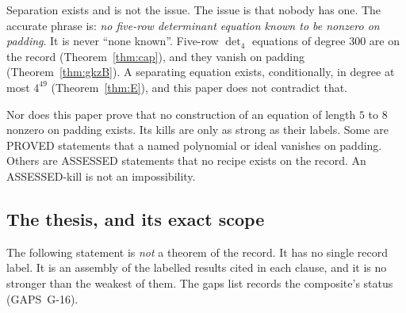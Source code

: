 \documentclass[11pt]{amsart}
\theoremstyle{plain}
\theoremstyle{definition}
\theoremstyle{remark}
\begin{document}
Separation exists and is not the issue. The issue is that nobody has one. The accurate
phrase is: \emph{no five-row determinant equation known to be nonzero on padding}. It is
never ``none known''. Five-row $\det_4$ equations of degree $300$ are on the record
(Theorem~\ref{thm:cap}), and they vanish on padding (Theorem~\ref{thm:gkzB}). A separating
equation exists, conditionally, in degree at most $4^{49}$ (Theorem~\ref{thm:E}), and this paper
does not contradict that.

Nor does this paper prove that no construction of an equation of length $5$ to $8$ nonzero on
padding exists. Its kills are only as strong as their labels. Some are PROVED statements that a
named polynomial or ideal vanishes on padding. Others are ASSESSED statements that no recipe
exists on the record. An ASSESSED-kill is not an impossibility.

\subsection{The thesis, and its exact scope}
The following statement is \emph{not} a theorem of the record. It has no single record label.
It is an assembly of the labelled results cited in each clause, and it is no stronger than the
weakest of them. The gaps list records the composite's status (GAPS~G-16).
\end{document}
